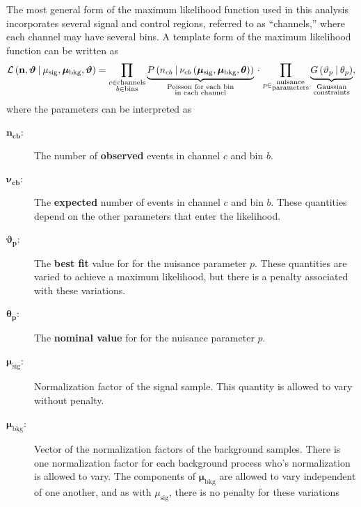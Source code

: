 The most general form of the maximum likelihood function used in this analysis
incorporates several signal and control regions, referred to as ``channels,''
where each channel may have several bins.
A template form of the maximum likelihood function can be written as
\begin{equation}
  \mathcal{L}\left(
    \mathbf{n},
    \boldsymbol{\vartheta}
    \given
    \mu_\mathrm{sig},
    \boldsymbol{\mu}_\mathrm{bkg},
    \boldsymbol{\vartheta}
  \right) =
  \prod_{\substack{c \in \mathrm{channels} \\ b \in \mathrm{bins}}}
  \underbrace{
    P
    \left( n_{cb} \given
      \nu_{cb} \left(
        \boldsymbol{\mu}_\mathrm{sig},
        \boldsymbol{\mu}_\mathrm{bkg},
        \boldsymbol{\theta}
      \right)
    \right)
  }_{\substack{\text{Poisson for each bin}\\\text{in each channel}}}
  \,
  \cdot
  \,
  \prod_{p \in \substack{\text{nuisance} \\ \text{parameters}}}
  \underbrace{
    G
    \left(\vartheta_{p} \given \theta_{p} \right)
  }_{\substack{\text{Gaussian}\\\text{constraints}}},
  \label{eqn:template_likelihood}
  \end{equation}
where the parameters can be interpreted as
\begin{description}
  \item[$\mathbf{n_{cb}}$:] 
    The number of \textbf{observed} events in channel $c$ and bin $b$.
  \item[$\boldsymbol{\nu_{cb}}$:] 
    The \textbf{expected} number of events in channel $c$ and bin $b$.
    These quantities depend on the other parameters that enter the likelihood.
  \item[$\boldsymbol{\vartheta_{p}}$:] 
    The \textbf{best fit} value for for the nuisance parameter $p$.
    These quantities are varied to achieve a maximum likelihood, but there is
    a penalty associated with these variations.
  \item[$\boldsymbol{\theta_{p}}$:] 
    The \textbf{nominal value} for for the nuisance parameter $p$.
  \item[$\boldsymbol{\mu_\mathrm{sig}}$:]
    Normalization factor of the signal sample.
    This quantity is allowed to vary without penalty.
  \item[$\boldsymbol{\mu_\mathrm{bkg}}$:]
    Vector of the normalization factors of the background samples.
    There is one normalization factor for each background process who's
    normalization is allowed to vary.
    The components of $\boldsymbol{\mu_\mathrm{bkg}}$ are allowed to vary
    independent of one another, and as with $\mu_\mathrm{sig}$, there is no
    penalty for these variations
\end{description}
